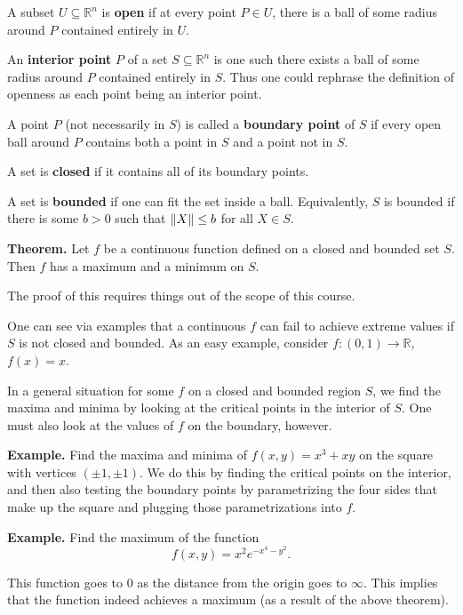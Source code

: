 \documentclass{article}
\begin{document}
A subset $U \subseteq \mathbb{R}^n$ is \textbf{open} if at every point $P \in U$, there is a ball of some radius around $P$
contained entirely in $U$.

An \textbf{interior point} $P$ of a set $S \subseteq \mathbb{R}^n$ is one such there exists a ball
of some radius around $P$ contained entirely in $S$. Thus one could rephrase the definition of openness
as each point being an interior point.

A point $P$ (not necessarily in $S$) is called a \textbf{boundary point} of $S$ if every open ball around 
$P$ contains both a point in $S$ and a point not in $S$.

A set is \textbf{closed} if it contains all of its boundary points.

A set is \textbf{bounded} if one can fit the set inside a ball. Equivalently, $S$ is bounded
if there is some $b>0$ such that $\norm{X} \leq b$ for all $X\in S$.

\textbf{Theorem.} Let $f$ be a continuous function defined on a closed and bounded set $S$. Then $f$
has a maximum and a minimum on $S$. 

The proof of this requires things out of the scope of this course.

One can see via examples that a continuous $f$ can fail to achieve extreme values if $S$ is not closed and bounded.
As an easy example, consider $f:(0,1)\to \mathbb{R}$, $f(x)=x$. 

In a general situation for some $f$ on a closed and bounded region $S$, we find the maxima and minima
by looking at the critical points in the interior of $S$. One must also look at the values of $f$ on the boundary,
however.

\textbf{Example.} Find the maxima and minima of $f(x,y) = x^3 + xy$ on the square with vertices
$(\pm 1, \pm 1)$. We do this by finding the critical points on the interior, and then also testing
the boundary points by parametrizing the four sides that make up the square and plugging those
parametrizations into $f$.

\textbf{Example.} Find the maximum of the function
\[f(x,y) = x^2 e^{-x^4-y^2}.\]

This function goes to $0$ as the distance from the origin goes
to $\infty$. This implies that the function indeed achieves a
maximum (as a result of the above theorem).
\end{document}
